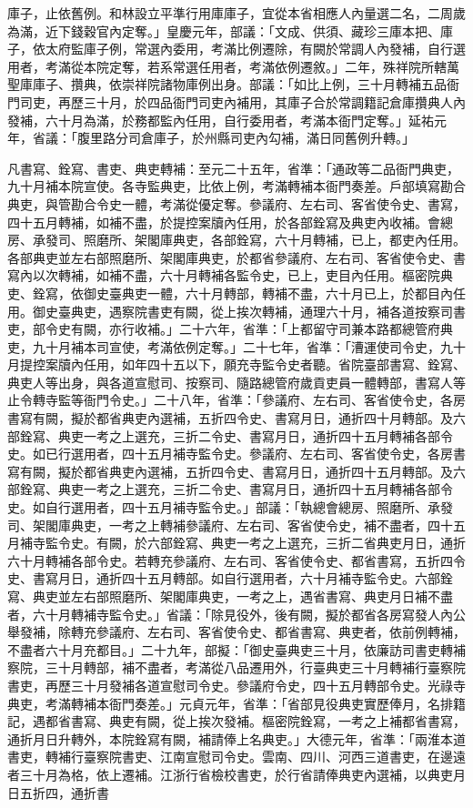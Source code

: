 \begin{pinyinscope}
庫子，止依舊例。和林設立平準行用庫庫子，宜從本省相應人內量選二名，二周歲為滿，近下錢穀官內定奪。」皇慶元年，部議：「文成、供須、藏珍三庫本把、庫子，依太府監庫子例，常選內委用，考滿比例遷除，有闕於常調人內發補，自行選用者，考滿從本院定奪，若系常選任用者，考滿依例遷敘。」二年，殊祥院所轄萬聖庫庫子、攢典，依崇祥院諸物庫例出身。部議：「如比上例，三十月轉補五品衙門司吏，再歷三十月，於四品衙門司吏內補用，其庫子合於常調籍記倉庫攢典人內發補，六十月為滿，於務都監內任用，自行委用者，考滿本衙門定奪。」延祐元年，省議：「腹里路分司倉庫子，於州縣司吏內勾補，滿日同舊例升轉。」



 凡書寫、銓寫、書吏、典吏轉補：至元二十五年，省準：「通政等二品衙門典吏，九十月補本院宣使。各寺監典吏，比依上例，考滿轉補本衙門奏差。戶部填寫勘合典吏，與管勘合令史一體，考滿從優定奪。參議府、左右司、客省使令史、書寫，四十五月轉補，如補不盡，於提控案牘內任用，於各部銓寫及典吏內收補。會總房、承發司、照磨所、架閣庫典吏，各部銓寫，六十月轉補，已上，都吏內任用。各部典吏並左右部照磨所、架閣庫典吏，於都省參議府、左右司、客省使令史、書寫內以次轉補，如補不盡，六十月轉補各監令史，已上，吏目內任用。樞密院典吏、銓寫，依御史臺典吏一體，六十月轉部，轉補不盡，六十月已上，於都目內任用。御史臺典吏，遇察院書吏有闕，從上挨次轉補，通理六十月，補各道按察司書吏，部令史有闕，亦行收補。」二十六年，省準：「上都留守司兼本路都總管府典吏，九十月補本司宣使，考滿依例定奪。」二十七年，省準：「漕運使司令史，九十月提控案牘內任用，如年四十五以下，願充寺監令史者聽。省院臺部書寫、銓寫、典吏人等出身，與各道宣慰司、按察司、隨路總管府歲貢吏員一體轉部，書寫人等止令轉寺監等衙門令史。」二十八年，省準：「參議府、左右司、客省使令史，各房書寫有闕，擬於都省典吏內選補，五折四令史、書寫月日，通折四十月轉部。及六部銓寫、典吏一考之上選充，三折二令史、書寫月日，通折四十五月轉補各部令史。如已行選用者，四十五月補寺監令史。參議府、左右司、客省使令史，各房書寫有闕，擬於都省典吏內選補，五折四令史、書寫月日，通折四十五月轉部。及六部銓寫、典吏一考之上選充，三折二令史、書寫月日，通折四十五月轉補各部令史。如自行選用者，四十五月補寺監令史。」部議：「執總會總房、照磨所、承發司、架閣庫典吏，一考之上轉補參議府、左右司、客省使令史，補不盡者，四十五月補寺監令史。有闕，於六部銓寫、典吏一考之上選充，三折二省典吏月日，通折六十月轉補各部令史。若轉充參議府、左右司、客省使令史、都省書寫，五折四令史、書寫月日，通折四十五月轉部。如自行選用者，六十月補寺監令史。六部銓寫、典吏並左右部照磨所、架閣庫典吏，一考之上，遇省書寫、典吏月日補不盡者，六十月轉補寺監令史。」省議：「除見役外，後有闕，擬於都省各房寫發人內公舉發補，除轉充參議府、左右司、客省使令史、都省書寫、典吏者，依前例轉補，不盡者六十月充都目。」二十九年，部擬：「御史臺典吏三十月，依廉訪司書吏轉補察院，三十月轉部，補不盡者，考滿從八品遷用外，行臺典吏三十月轉補行臺察院書吏，再歷三十月發補各道宣慰司令史。參議府令史，四十五月轉部令史。光祿寺典吏，考滿轉補本衙門奏差。」元貞元年，省準：「省部見役典吏實歷俸月，名排籍記，遇都省書寫、典吏有闕，從上挨次發補。樞密院銓寫，一考之上補都省書寫，通折月日升轉外，本院銓寫有闕，補請俸上名典吏。」大德元年，省準：「兩淮本道書吏，轉補行臺察院書吏、江南宣慰司令史。雲南、四川、河西三道書吏，在邊遠者三十月為格，依上遷補。江浙行省檢校書吏，於行省請俸典吏內選補，以典吏月日五折四，通折書
\end{pinyinscope}
